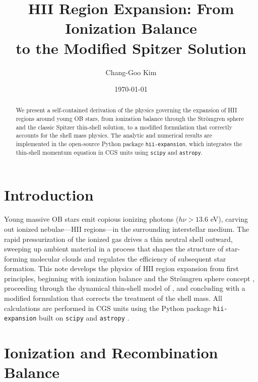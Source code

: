 \documentclass[12pt]{article}
\title{HII Region Expansion: From Ionization Balance\\to the Modified Spitzer Solution}
\author{Chang-Goo Kim}
\date{\today}
\begin{document}
\maketitle

\begin{abstract}
We present a self-contained derivation of the physics governing the expansion
of HII regions around young OB stars, from ionization balance through the
Str\"omgren sphere and the classic Spitzer thin-shell solution, to a modified
formulation that correctly accounts for the shell mass physics.  The analytic
and numerical results are implemented in the open-source Python package
\texttt{hii-expansion}, which integrates the thin-shell momentum equation in CGS
units using \texttt{scipy} and \texttt{astropy}.
\end{abstract}

\section{Introduction}
\label{sec:intro}

Young massive OB stars emit copious ionizing photons ($h\nu > 13.6$ eV),
carving out ionized nebulae---HII regions---in the surrounding interstellar
medium.  The rapid pressurization of the ionized gas drives a thin neutral
shell outward, sweeping up ambient material in a process that shapes the
structure of star-forming molecular clouds and regulates the efficiency of
subsequent star formation.  This note develops the physics of HII region
expansion from first principles, beginning with ionization balance and the
Str\"omgren sphere concept \citep{Stromgren1939}, proceeding through the
dynamical thin-shell model of \citet{Spitzer1978}, and concluding with a
modified formulation that corrects the treatment of the shell mass.
All calculations are performed in CGS units using the Python package
\texttt{hii-expansion} built on \texttt{scipy} \citep{Virtanen2020} and
\texttt{astropy} \citep{Astropy2022}.

\section{Ionization and Recombination Balance}
\label{sec:ionization}
\end{document}
